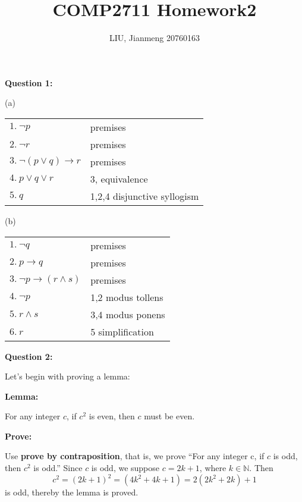 \documentclass[a4paper,12pt]{article}
\title{\textbf{COMP2711} Homework2}
\author{LIU, Jianmeng 20760163}
\date{}
\begin{document}
    \maketitle

    \begin{spacing}{1.4}

    \setlength{\parindent}{0px}

    \textbf{Question 1:}

    (a)

    \begin{tabular}{ll}
    $1.\ \neg p$ & {\rm premises} \\
    $2.\ \neg r$ & {\rm premises} \\
    $3.\ \neg (p\vee q) \rightarrow r$ & {\rm premises}\\
    $4.\ p \vee q \vee r$ & {\rm 3, equivalence}\\
    $5.\ q$ & {\rm 1,2,4 disjunctive syllogism}
    \end{tabular}
    \vspace{20px}

    (b)

    \begin{tabular}{ll}
        $1.\ \neg q$ & {\rm premises}\\
        $2.\ p \rightarrow q$ & {\rm premises}\\
        $3.\ \neg p \rightarrow (r \wedge s)$ & {\rm premises}\\
        $4.\ \neg p$ & {\rm 1,2 modus tollens}\\
        $5.\ r\wedge s$ & {\rm 3,4 modus ponens}\\
        $6.\ r$ & {\rm 5 simplification}
    \end{tabular}

    \vspace{30px}


    \textbf{Question 2:}

    \hspace{2em} Let's begin with proving a lemma:

    \textbf{Lemma:}  

    \hspace{2em} 
    For any integer $c$, if $c^2$ is even, then $c$ must be even.

    \textbf{Prove:}

    \hspace{2em}
    Use \textbf{prove by contraposition}, that is, we prove 
    ``For any integer c, if $c$ is odd, then $c^2$ is odd.''
    Since $c$ is odd, we suppose $c=2k+1$, where $k\in \mathbb{N}$.
    Then $$c^2=(2k+1)^2=(4k^2+4k+1)=2(2k^2+2k)+1$$ is odd, 
    thereby the lemma is proved.\\


\end{spacing}
\end{document}
